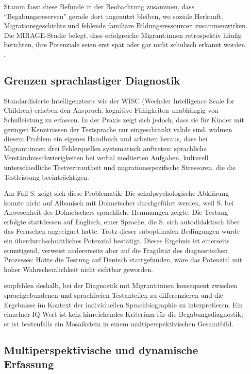 \documentclass[ngerman, a4paper]{article}
\begin{document}
Stamm fasst diese Befunde in der Beobachtung zusammen, dass \enquote{Begabungsreserven}
gerade dort ungenutzt bleiben, wo soziale Herkunft, Migrationsgeschichte und fehlende
familiäre Bildungsressourcen zusammenwirken. Die MIRAGE-Studie belegt, dass
erfolgreiche Migrant:innen retrospektiv häufig berichten, ihre Potenziale seien erst spät
oder gar nicht schulisch erkannt worden \parencite{stamm2014mirage,stamm2014handbuch}.

\subsection{Grenzen sprachlastiger Diagnostik}

Standardisierte Intelligenztests wie der WISC (Wechsler Intelligence Scale for Children)
erheben den Anspruch, kognitive Fähigkeiten unabhängig von Schulleistung zu erfassen.
In der Praxis zeigt sich jedoch, dass sie für Kinder mit geringen Kenntnissen der
Testsprache nur eingeschränkt valide sind. \textcite{maehler2018diagnostik} widmen
diesem Problem ein eigenes Handbuch und arbeiten heraus, dass bei Migrant:innen
drei Fehlerquellen systematisch auftreten: sprachliche Verständnisschwierigkeiten bei
verbal mediierten Aufgaben, kulturell unterschiedliche Testvertrautheit und
migrationsspezifische Stressoren, die die Testleistung beeinträchtigen.

Am Fall S. zeigt sich diese Problematik: Die schulpsychologische Abklärung
konnte nicht auf Albanisch mit Dolmetscher durchgeführt werden, weil S. bei
Anwesenheit des Dolmetschers sprachliche Hemmungen zeigte. Die Testung erfolgte
stattdessen auf Englisch, einer Sprache, die S. sich autodidaktisch über das Fernsehen
angeeignet hatte. Trotz dieser suboptimalen Bedingungen wurde ein
überdurchschnittliches Potenzial bestätigt. Dieses Ergebnis ist einerseits ermutigend,
verweist andererseits aber auf die Fragilität des diagnostischen Prozesses: Hätte die
Testung auf Deutsch stattgefunden, wäre das Potenzial mit hoher Wahrscheinlichkeit
nicht sichtbar geworden.

\textcite{maehler2018diagnostik} empfehlen deshalb, bei der Diagnostik mit Migrant:innen konsequent
zwischen sprachgebundenen und sprachfreien Testanteilen zu differenzieren und die
Ergebnisse im Kontext der individuellen Sprachbiographie zu interpretieren. Ein einzelner
IQ-Wert ist kein hinreichendes Kriterium für die Begabungsdiagnostik; er ist bestenfalls
ein Mosaikstein in einem multiperspektivischen Gesamtbild.

\subsection{Multiperspektivische und dynamische Erfassung}
\end{document}
